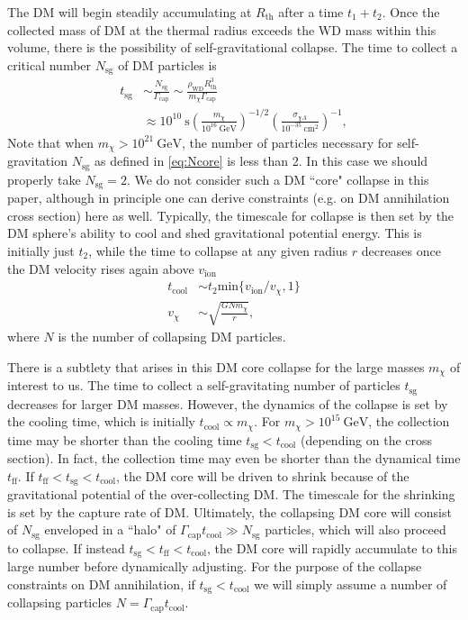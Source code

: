 \documentclass[preprintnumbers,amsmath,amssymb,prd,superscriptaddress]{revtex4}
\newcommand{\GeV}{\text{GeV}}
\newcommand{\cm}{\text{cm}}
\newcommand{\x}[1]{\ensuremath{\text{#1}}} %
\newcommand{\ion}{\text{ion}}
\def\r{\right)}
\def\l{\left(}
\begin{document}
\begin{appendices}
The DM will begin steadily accumulating at $R_\text{th}$ after a time $t_1 + t_2$.
Once the collected mass of DM at the thermal radius exceeds the WD mass within this volume, there is the possibility of self-gravitational collapse.
The time to collect a critical number $N_\text{sg}$ of DM particles is
\begin{align}
\label{eq:Ncore}
    t_\text{sg} &\sim \frac{N_\text{sg}}{\Gamma_\text{cap}}  \sim
    \frac{\rho_\text{WD} R^3_\text{th}}{m_\chi \Gamma_\text{cap}} \\
    &\approx 10^{10} ~\text{s} \l \frac{m_\chi}{10^{16} ~\GeV} \r^{-1/2}
    \l \frac{\sigma_{\chi A}}{10^{-35} ~\cm^2} \r^{-1}, \nonumber
\end{align}
Note that when $m_\chi > 10^{21} ~\GeV$, the number of particles necessary for self-gravitation $N_\text{sg}$ as defined in \eqref{eq:Ncore} is less than 2.
In this case we should properly take $N_\text{sg} = 2$. 
We do not consider such a DM ``core" collapse in this paper, although in principle one can derive constraints (e.g. on DM annihilation cross section) here as well. 
Typically, the timescale for collapse is then set by the DM sphere's ability to cool and shed gravitational potential energy.
This is initially just $t_2$, while the time to collapse at any given radius $r$ decreases once the DM velocity rises again above $v_\ion$
\begin{align}
  t_\text{cool} &\sim t_2 \text{min}\{v_\text{ion}/v_\chi,1\} \\
  v_\chi &\sim \sqrt{\frac{G N m_\chi}{r}}, \nonumber
\end{align}
where $N$ is the number of collapsing DM particles.

There is a subtlety that arises in this DM core collapse for the large masses $m_\chi$ of interest to us.
The time to collect a self-gravitating number of particles $t_\text{sg}$ decreases for larger DM masses.
However, the dynamics of the collapse is set by the cooling time, which is initially $t_\text{cool} \propto m_\chi$.
For $m_\chi > 10^{15} ~\GeV$, the collection time may be shorter than the cooling time $t_\text{sg} < t_\text{cool}$ (depending on the cross section). 
In fact, the collection time may even be shorter than the dynamical time $t_\text{ff}$. 
If $t_\text{ff} < t_\text{sg} <t_\text{cool}$, the DM core will be driven to shrink because of the gravitational potential of the over-collecting DM.
The timescale for the shrinking is set by the capture rate of DM.
Ultimately, the collapsing DM core will consist of $N_\text{sg}$ enveloped in a ``halo" of $\Gamma_\text{cap} t_\text{cool} \gg N_\text{sg}$ particles, which will also proceed to collapse.
If instead $t_\text{sg} < t_\text{ff} <t_\text{cool}$, the DM core will rapidly accumulate to this large number before dynamically adjusting. 
For the purpose of the collapse constraints on DM annihilation, if $t_\x{sg} < t_\text{cool}$ we will simply assume a number of collapsing particles $N = \Gamma_\text{cap} t_\text{cool}$. 
\end{appendices}
\end{document}
